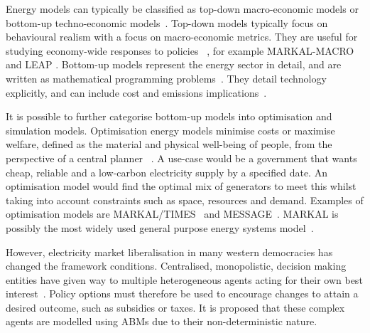 
Energy models can typically be classified as top-down macro-economic models or bottom-up techno-economic models~\cite{Bohringer1998}. Top-down models typically focus on behavioural realism with a focus on macro-economic metrics. They are useful for studying economy-wide responses to policies ~\cite{Hall2016}, for example MARKAL-MACRO \cite{Fishbone1981} and LEAP \cite{Heaps2016}. Bottom-up models represent the energy sector in detail, and are written as mathematical programming problems~\cite{Gargiulo2013}. They detail technology explicitly, and can include cost and emissions implications~\cite{Hall2016}.

It is possible to further categorise bottom-up models into optimisation and simulation models. Optimisation energy models minimise costs or maximise welfare, defined as the material and physical well-being of people, from the perspective of a central planner ~\cite{Keles2017}. A use-case would be a government that wants cheap, reliable and a low-carbon electricity supply by a specified date. An optimisation model would find the optimal mix of generators to meet this whilst taking into account constraints such as space, resources and demand. Examples of optimisation models are MARKAL/TIMES~\cite{Fishbone1981} and MESSAGE~\cite{Schrattenholzer1981}. MARKAL is possibly the most widely used general purpose energy systems model~\cite{Pfenninger2014}.

However, electricity market liberalisation in many western democracies has changed the framework conditions. Centralised, monopolistic, decision making entities have given way to multiple heterogeneous agents acting for their own best interest~\cite{Most2010}. Policy options must therefore be used to encourage changes to attain a desired outcome, such as subsidies or taxes. It is proposed that these complex agents are modelled using ABMs due to their non-deterministic nature. 

